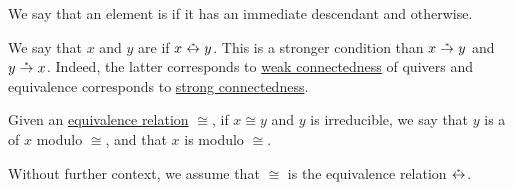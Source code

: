 \begin{definition}
\begin{thmenum}
    We say that an element is  if it has an immediate descendant and  otherwise.

     We say that \( x \) and \( y \) are  if \( x \reloset {*} \leftrightarrow y \). This is a stronger condition than \( x \reloset {*} \to y \) and \( y \reloset {*} \to x \). Indeed, the latter corresponds to \hyperref[def:quiver_connectedness/weak]{weak connectedness} of quivers and equivalence corresponds to \hyperref[def:quiver_connectedness/strong]{strong connectedness}.

     Given an \hyperref[def:equivalence_relation]{equivalence relation} \( \cong \), if \( x \cong y \) and \( y \) is irreducible, we say that \( y \) is a  of \( x \) modulo \( \cong \), and that \( x \) is  modulo \( \cong \).

    Without further context, we assume that \( \cong \) is the equivalence relation \( \reloset {*} \leftrightarrow \).
  \end{thmenum}
\end{definition}

